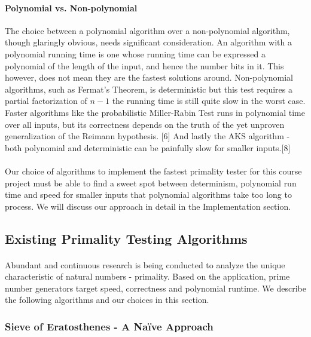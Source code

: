 \documentclass[paper=a4, fontsize=11pt]{scrartcl}	%
\numberwithin{equation}{section}		%
\numberwithin{figure}{section}		%
\numberwithin{table}{section}		%
\begin{document}
\paragraph{Polynomial vs. Non-polynomial}
The choice between a polynomial algorithm over a non-polynomial algorithm, though glaringly obvious, needs significant consideration. An algorithm with a polynomial running time is one whose running time can be expressed a polynomial of the length of the input, and hence the number bits in it. This however, does not mean they are the fastest solutions around. Non-polynomial algorithms, such as Fermat's Theorem, is deterministic but this test requires a partial factorization of $n - 1$ the running time is still quite slow in the worst case. Faster algorithms like the probabilistic Miller-Rabin Test runs in polynomial time over all inputs, but its correctness depends on the truth of the yet unproven generalization of the Reimann hypothesis. [6] And lastly the AKS algorithm - both polynomial and deterministic can be painfully slow for smaller inputs.[8]

\paragraph{}Our choice of algorithms to implement the fastest primality tester for this course project must be able to find a sweet spot between determinism, polynomial run time and speed for smaller inputs that polynomial algorithms take too long to process. We will discuss our approach in detail in the Implementation section. 

\subsection{Existing Primality Testing Algorithms}
\paragraph{}Abundant and continuous research is being conducted to analyze the unique characteristic of natural numbers - primality. Based on the application, prime number generators target speed, correctness and polynomial runtime. We describe the following algorithms and our choices in this section.

\subsubsection{Sieve of Eratosthenes - A Na\"{i}ve Approach}
\end{document}
